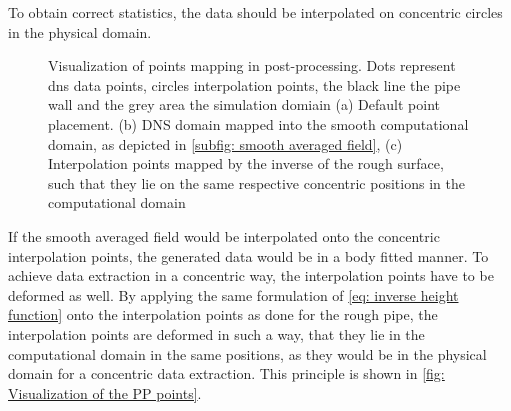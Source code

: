 To obtain correct statistics, the data should be interpolated on concentric circles in the physical domain.
\begin{figure}
    \centering
    \begin{subfigure}{0.325\textwidth}
        \subcaption{}
        
        \label{subfig: PP points at beginning}
    \end{subfigure}
    \hfill
    \begin{subfigure}{0.325\textwidth}
        \subcaption{}
        
        \label{subfig: PP points after mapping to smooth}
    \end{subfigure}
    \hfill
    \begin{subfigure}{0.325\textwidth}
        \subcaption{}
        
        \label{subfig: PP points after inverse maping}
    \end{subfigure}
    \caption{Visualization of points mapping in post-processing. Dots represent \acrshort{dns} data points, circles interpolation points, the black line the pipe wall and the grey area the simulation domiain (a) Default point placement. (b) DNS domain mapped into the smooth computational domain, as depicted in \autoref{subfig: smooth averaged field}, (c) Interpolation points mapped by the inverse of the rough surface, such that they lie on the same respective concentric positions in the computational domain}
    \label{fig: Visualization of the PP points}
\end{figure} 
If the smooth averaged field would be interpolated onto the concentric interpolation points, the generated data would be in a body fitted manner.
To achieve data extraction in a concentric way, the interpolation points have to be deformed as well. 
By applying the same formulation of \autoref{eq: inverse height function} onto the interpolation points as done for the rough pipe, the interpolation points are deformed in such a way, that they lie in the computational domain in the same positions, as they would be in the physical domain for a concentric data extraction. This principle is shown in \autoref{fig: Visualization of the PP points}.

